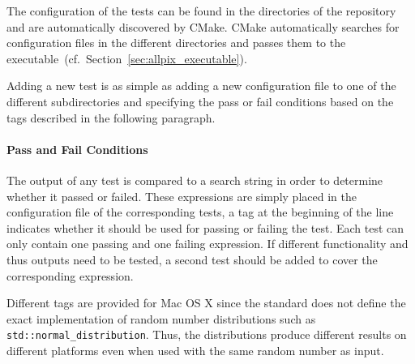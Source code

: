 The configuration of the tests can be found in the  directories of the repository and are automatically discovered by CMake.
CMake automatically searches for \apsq configuration files in the different directories and passes them to the \apsq executable~(cf.\ Section~\ref{sec:allpix_executable}).

Adding a new test is as simple as adding a new configuration file to one of the different subdirectories and specifying the pass or fail conditions based on the tags described in the following paragraph.

\paragraph{Pass and Fail Conditions}

The output of any test is compared to a search string in order to determine whether it passed or failed.
These expressions are simply placed in the configuration file of the corresponding tests, a tag at the beginning of the line indicates whether it should be used for passing or failing the test.
Each test can only contain one passing and one failing expression.
If different functionality and thus outputs need to be tested, a second test should be added to cover the corresponding expression.

Different tags are provided for Mac OS X since the \CPP standard does not define the exact implementation of random number distributions such as \texttt{std::normal\_distribution}.
Thus, the distributions produce different results on different platforms even when used with the same random number as input.

